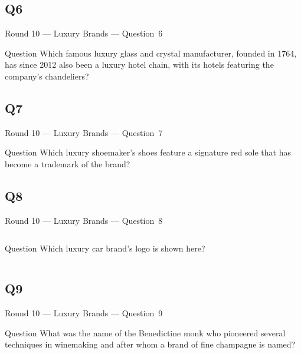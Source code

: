 \documentclass[11pt]{beamer}
\begin{document}
\subsection*{Q6}
\begin{frame}[t]{Round 10 --- Luxury Brands --- \mbox{Question 6}}
\vspace{-0.5em}
\begin{block}{Question}
Which famous luxury glass and crystal manufacturer, founded in 1764, has since 2012 also been a luxury hotel chain, with its hotels featuring the company's chandeliers?
\end{block}
\end{frame}
\subsection*{Q7}
\begin{frame}[t]{Round 10 --- Luxury Brands --- \mbox{Question 7}}
\vspace{-0.5em}
\begin{block}{Question}
Which luxury shoemaker's shoes feature a signature red sole that has become a trademark of the brand?
\end{block}
\end{frame}
\subsection*{Q8}
\begin{frame}[t]{Round 10 --- Luxury Brands --- \mbox{Question 8}}
\vspace{-0.5em}
\begin{columns}[T,totalwidth=\linewidth]
\begin{column}{0.37\linewidth}
\begin{block}{Question}
Which luxury car brand's logo is shown here?
\end{block}
\end{column}
\begin{column}{0.62\linewidth}
\begin{center}
\texttt{[image: \{Images/maserati]}.jpg}
\end{center}
\end{column}
\end{columns}
\end{frame}
\subsection*{Q9}
\begin{frame}[t]{Round 10 --- Luxury Brands --- \mbox{Question 9}}
\vspace{-0.5em}
\begin{block}{Question}
What was the name of the Benedictine monk who pioneered several techniques in winemaking and after whom a brand of fine champagne is named?
\end{block}
\end{frame}
\end{document}
